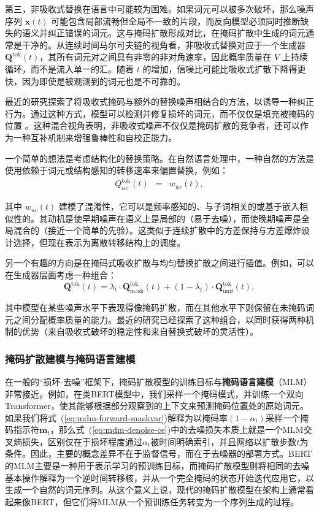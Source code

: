 第三，非吸收式替换在语言中可能较为困难。如果词元可以被多次破坏，那么噪声序列 $\mathbf{x}(t)$ 可能包含局部流畅但全局不一致的片段，而反向模型必须同时推断缺失的语义并纠正错误的词元。这与掩码扩散形成对比，在掩码扩散中生成的词元通常是干净的。从连续时间马尔可夫链的视角看，非吸收式替换对应于一个生成器 $\mathbf{Q}^{\mathrm{tok}}(t)$，其所有词元对之间具有非零的非对角速率，因此概率质量在 $V$ 上持续循环，而不是流入单一的汇。随着 $t$ 的增加，信噪比可能比吸收式扩散下降得更快，因为即使是被观测到的词元也是不可靠的。

最近的研究探索了将吸收式掩码与额外的替换噪声相结合的方法，以诱导一种纠正行为。通过这种方式，模型可以检测并修复损坏的词元，而不仅仅是填充被掩码的位置 \citep{zhang-etal:2025corrective,rutte-etal:2025generalized}。这种混合视角表明，非吸收式噪声不仅仅是掩码扩散的竞争者，还可以作为一种互补机制来增强鲁棒性和自校正能力。

一个简单的想法是考虑结构化的替换策略。在自然语言处理中，一种自然的方法是使用依赖于词元或结构感知的转移速率来偏置替换，例如：
\begin{eqnarray}
Q^{\mathrm{tok}}_{uv}(t) & = & w_{uv}(t),
\end{eqnarray}

\noindent 其中 $w_{uv}(t)$ 建模了混淆性，它可以是频率感知的、与子词相关的或基于嵌入相似性的。其动机是使早期噪声在语义上是局部的（易于去噪），而使晚期噪声是全局混合的（接近一个简单的先验）。这类似于连续扩散中的方差保持与方差爆炸设计选择，但现在表示为离散转移结构上的调度。

另一个有趣的方向是在掩码式吸收扩散与均匀替换扩散之间进行插值。例如，可以在生成器层面考虑一种组合：
\begin{equation}
\mathbf{Q}^{\mathrm{tok}}(t) = \lambda_t \cdot \mathbf{Q}_{\text{mask}}^{\mathrm{tok}}(t) + (1-\lambda_t) \cdot \mathbf{Q}_{\text{unif}}^{\mathrm{tok}}(t),
\end{equation}

\noindent 其中模型在某些噪声水平下表现得像掩码扩散，而在其他水平下则保留在未掩码词元之间分配概率质量的能力。最近的研究已经探索了这种组合，以同时获得两种机制的优势（来自吸收式破坏的稳定性和来自替换式破坏的灵活性）。
\subsubsection{掩码扩散建模与掩码语言建模}

在一般的“损坏-去噪”框架下，掩码扩散模型的训练目标与\textbf{掩码语言建模}（MLM）非常接近。例如，在类BERT模型中，我们采样一个掩码模式，并训练一个双向Transformer，使其能够根据部分观察到的上下文来预测掩码位置处的原始词元\citep{devlin-etal:2019bert}。如果我们将式~(\ref{eq:mdm-forward-maskvar})解释为以掩码率$(1-\alpha_t)$采样一个掩码指示符$\mathbf{m}_t$，那么式~(\ref{eq:mdm-denoise-ce})中的去噪损失本质上就是一个MLM交叉熵损失，区别仅在于损坏程度通过$\alpha_t$被时间明确索引，并且网络以扩散步数$t$为条件。因此，主要的概念差异不在于监督信号，而在于去噪器的部署方式。BERT的MLM主要是一种用于表示学习的预训练目标，而掩码扩散模型则将相同的去噪基本操作解释为一个逆时间转移核，并从一个完全掩码的状态开始迭代应用它，以生成一个自然的词元序列。从这个意义上说，现代的掩码扩散模型在架构上通常看起来像BERT，但它们将MLM从一个预训练任务转变为一个序列生成的过程。

